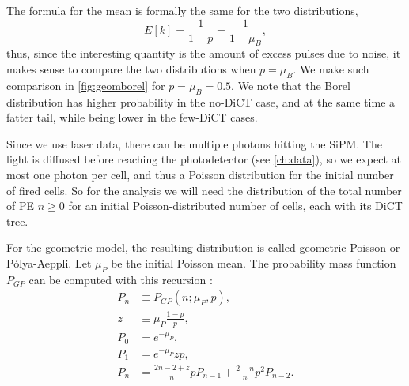 The formula for the mean is formally the same for the two distributions,
%
\begin{equation}
    E[k] = \frac 1 {1 - p} = \frac 1 {1 - \mu_B},
\end{equation}
%
thus, since the interesting quantity is the amount of excess pulses due to
noise, it makes sense to compare the two distributions when $p = \mu_B$. We
make such comparison in \autoref{fig:geomborel} for $p = \mu_B = 0.5$. We note
that the Borel distribution has higher probability in the no-DiCT case, and at
the same time a fatter tail, while being lower in the few-DiCT cases.

\begin{figure}
    

    
\end{figure}

Since we use laser data, there can be multiple photons hitting the SiPM. The
light is diffused before reaching the photodetector (see \autoref{ch:data}), so
we expect at most one photon per cell, and thus a Poisson distribution for the
initial number of fired cells. So for the analysis we will need the
distribution of the total number of PE $n \ge 0$ for an initial
Poisson-distributed number of cells, each with its DiCT tree.

For the geometric model, the resulting distribution is called geometric Poisson
or Pólya-Aeppli. Let $\mu_P$ be the initial Poisson mean. The probability mass
function $P_{GP}$ can be computed with this recursion \cite[5]{nuel2008}:
%
\begin{align}
    P_n &\equiv P_{GP}(n;\mu_P,p), \\
    z &\equiv \mu_P \frac{1-p}p, \\
    P_0 &= e^{-\mu_P}, \\
    P_1 &= e^{-\mu_P} zp, \\
    P_n &= \frac{2n - 2 + z}n p P_{n-1} + \frac{2-n}n p^2 P_{n-2}.
    \label{eq:geompoisson}
\end{align}

